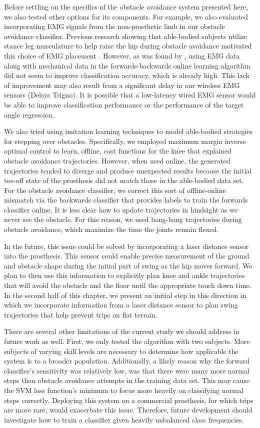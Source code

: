 Before settling on the specifics of the obstacle avoidance system presented
here, we also tested other options for its components. For example, we also
evaluated incorporating EMG signals from the non-prosthetic limb in our obstacle
avoidance classifier. Previous research showing that able-bodied subjects
utilize stance leg musculature to help raise the hip during obstacle avoidance
motivated this choice of EMG placement \citep{patla1995role}. However, as was
found by \citet{spanias2018online}, using EMG data along with mechanical data in
the forwards-backwards online learning algorithm did not seem to improve
classification accuracy, which is already high. This lack of improvement may
also result from a significant delay in our wireless EMG sensors (Delsys
Trigno). It is possible that a low-latency wired EMG sensor would be able to
improve classification performance or the performance of the target angle
regression.

We also tried using imitation learning techniques to model able-bodied
strategies for stepping over obstacles. Specifically, we employed maximum margin
inverse optimal control \citep{ratliff2007online} to learn, offline, cost
functions for the knee that explained obstacle avoidance trajectories. However,
when used online, the generated trajectories tended to diverge and produce
unexpected results because the initial toe-off state of the prosthesis did not
match those in the able-bodied data set. For the obstacle avoidance classifier,
we correct this sort of offline-online mismatch via the backwards classifier
that provides labels to train the forwards classifier online. It is less clear
how to update trajectories in hindsight as we never see the obstacle. For this
reason, we used bang-bang trajectories during obstacle avoidance, which maximize
the time the joints remain flexed.

In the future, this issue could be solved by incorporating a laser distance
sensor into the prosthesis. This sensor could enable precise measurement of the
ground and obstacle shape during the initial part of swing as the hip moves
forward. We plan to then use this information to explicitly plan knee and ankle
trajectories that will avoid the obstacle and the floor until the appropriate
touch down time. In the second half of this chapter, we present an initial step
in this direction in which we incorporate information from a laser distance
sensor to plan swing trajectories that help prevent trips on flat terrain.

There are several other limitations of the current study we should address in
future work as well. First, we only tested the algorithm with two subjects. More
subjects of varying skill levels are necessary to determine how applicable the
system is to a broader population. Additionally, a likely reason why the forward
classifier's sensitivity was relatively low, was that there were many more
normal steps than obstacle avoidance attempts in the training data set. This may
cause the SVM loss function's minimum to focus more heavily on classifying
normal steps correctly. Deploying this system on a commercial prosthesis, for
which trips are more rare, would exacerbate this issue. Therefore, future
development should investigate how to train a classifier given heavily
unbalanced class frequencies.
